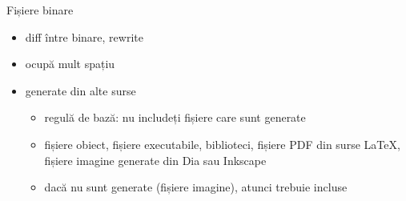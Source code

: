 \documentclass{beamer}
\begin{document}
%
%

\begin{frame}{Fișiere binare}
  \begin{itemize}
    \item diff între binare, rewrite
    \item ocupă mult spațiu
    \item generate din alte surse
      \begin{itemize}
        \item regulă de bază: nu includeți fișiere care sunt generate
	\item fișiere obiect, fișiere executabile, biblioteci, fișiere PDF din
	  surse \LaTeX, fișiere imagine generate din Dia sau Inkscape
	\item dacă nu sunt generate (fișiere imagine), atunci trebuie incluse
      \end{itemize}
  \end{itemize}
\end{frame}
\end{document}
